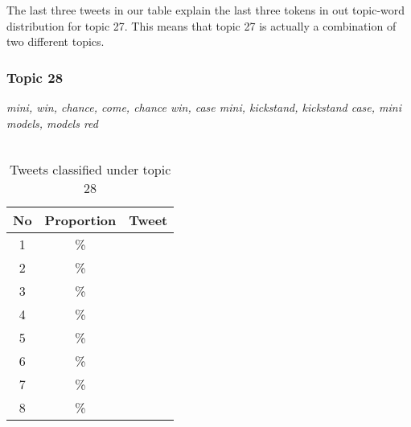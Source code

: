 The last three tweets in our table explain the last three tokens in out topic-word distribution for
topic 27. This means that topic 27 is actually a combination of two different topics.



\subsubsection{Topic 28}
\label{sec:topic_28}
\textit{mini, win, chance, come, chance win, case mini, kickstand, kickstand case, mini models,
models red}\\\\

\begin{table}[H]
  \begin{tabular}{c c p{13cm}} \toprule
    No & Proportion & Tweet \\ \midrule
    1  & \%       & \\ \midrule
    2  & \%       & \\ \midrule
    3  & \%       & \\ \midrule
    4  & \%       & \\ \midrule
    5  & \%       & \\ \midrule
    6  & \%       & \\ \midrule
    7  & \%       & \\ \midrule
    8  & \%       & \\ \bottomrule
  \end{tabular}
  \caption{Tweets classified under topic 28}
  \label{tab:tweets_under_28}
\end{table}

